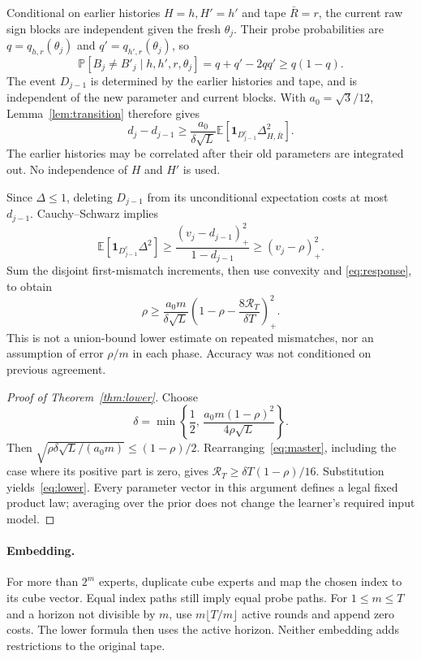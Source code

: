 \documentclass[11pt]{article}
\newcommand{\E}{\mathbb E}
\newcommand{\Prob}{\mathbb P}
\newcommand{\1}{\mathbf 1}
\newcommand{\pos}[1]{\left(#1\right)_+}
\begin{document}
Conditional on earlier histories $H=h,H'=h'$ and tape $\bar R=r$,
the current raw sign blocks are independent given the fresh
$\theta_j$. Their probe probabilities are
$q=q_{h,r}(\theta_j)$ and $q'=q_{h',r}(\theta_j)$, so
\[
 \Prob[B_j\ne B'_j\mid h,h',r,\theta_j]
  =q+q'-2qq'\ge q(1-q).
\]
The event $D_{j-1}$ is determined by the earlier histories and tape,
and is independent of the new parameter and current blocks.
With $a_0=\sqrt3/12$, Lemma~\ref{lem:transition} therefore gives
\[
 d_j-d_{j-1}\ge
 \frac{a_0}{\delta\sqrt L}
 \E\left[\1_{D_{j-1}^c}\Delta_{H,\bar R}^2\right].
\]
The earlier histories may be correlated after their old parameters
are integrated out. No independence of $H$ and $H'$ is used.

Since $\Delta\le1$, deleting $D_{j-1}$ from its unconditional
expectation costs at most $d_{j-1}$. Cauchy--Schwarz implies
\[
 \E[\1_{D_{j-1}^c}\Delta^2]
 \ge\frac{\pos{v_j-d_{j-1}}^2}{1-d_{j-1}}
 \ge\pos{v_j-\rho}^2.
\]
Sum the disjoint first-mismatch increments, then use convexity and
\eqref{eq:response}, to obtain
\begin{equation}\label{eq:master}
 \rho\ge\frac{a_0m}{\delta\sqrt L}
       \pos{1-\rho-\frac{8\mathcal R_T}{\delta T}}^2.
\end{equation}
This is not a union-bound lower estimate on repeated mismatches,
nor an assumption of error $\rho/m$ in each phase. Accuracy was
not conditioned on previous agreement.

\begin{proof}[Proof of Theorem~\ref{thm:lower}]
Choose
\[
 \delta=\min\left\{\frac12,\,
      \frac{a_0m(1-\rho)^2}{4\rho\sqrt L}\right\}.
\]
Then $\sqrt{\rho\delta\sqrt L/(a_0m)}\le(1-\rho)/2$.
Rearranging~\eqref{eq:master}, including the case where its positive
part is zero, gives $\mathcal R_T\ge\delta T(1-\rho)/16$.
Substitution yields~\eqref{eq:lower}. Every parameter vector in this
argument defines a legal fixed product law; averaging over the prior
does not change the learner's required input model.
\end{proof}

\paragraph{Embedding.}
For more than $2^m$ experts, duplicate cube experts and map the chosen
index to its cube vector. Equal index paths still imply equal probe
paths. For $1\le m\le T$ and a horizon not divisible by $m$, use
$m\lfloor T/m\rfloor$ active rounds and append zero costs.
The lower formula then uses the active horizon. Neither embedding
adds restrictions to the original tape.
\end{document}
